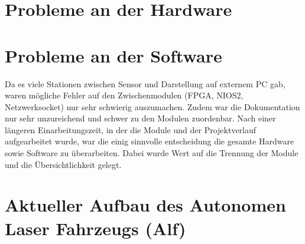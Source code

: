 \section{Probleme an der Hardware}




\section{Probleme an der Software}

Da es viele Stationen zwischen Sensor und Darstellung auf externem PC gab, waren mögliche Fehler auf den Zwischenmodulen (FPGA, NIOS2, Netzwerksocket) nur sehr schwierig auszumachen. Zudem war die Dokumentation nur sehr unzureichend und schwer zu den Modulen zuordenbar. Nach einer längeren Einarbeitungszeit, in der die Module und der Projektverlauf aufgearbeitet wurde, war die einig sinnvolle entscheidung die gesamte Hardware sowie Software zu überarbeiten. Dabei wurde Wert auf die Trennung der Module und die Übersichtlichkeit gelegt.

\section{Aktueller Aufbau des Autonomen Laser Fahrzeugs (Alf)}
